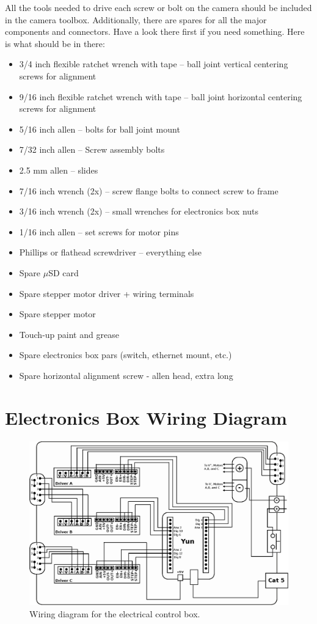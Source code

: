 \documentclass[11pt]{article}
\begin{document}
All the tools needed to drive each screw or bolt on the camera should be included in the camera toolbox. 
Additionally, there are spares for all the major components and connectors.
Have a look there first if you need something.
Here is what should be in there:

\begin{itemize}
	\item 3/4 inch flexible ratchet wrench with tape -- ball joint vertical centering screws for alignment
	\item 9/16 inch flexible ratchet wrench with tape -- ball joint horizontal centering screws for alignment
	\item 5/16 inch allen -- bolts for ball joint mount
	\item 7/32 inch allen -- Screw assembly bolts
	\item 2.5 mm allen -- slides
	\item 7/16 inch wrench (2x) -- screw flange bolts to connect screw to frame
	\item 3/16 inch wrench (2x) -- small wrenches for electronics box nuts
	\item 1/16 inch allen -- set screws for motor pins
	\item Phillips or flathead screwdriver -- everything else
	\item Spare $\mu$SD card
	\item Spare stepper motor driver + wiring terminals
	\item Spare stepper motor
	\item Touch-up paint and grease
	\item Spare electronics box pars (switch, ethernet mount, etc.)
	\item Spare horizontal alignment screw - allen head, extra long
\end{itemize}


\section{Electronics Box Wiring Diagram}
\begin{figure}[h]
\begin{center}
\includegraphics[width = 5.5in]{wiringDrawingUpdate.eps}
\caption{Wiring diagram for the electrical control box.}  
\label{fd2}
\end{center}
\end{figure}
\end{document}
